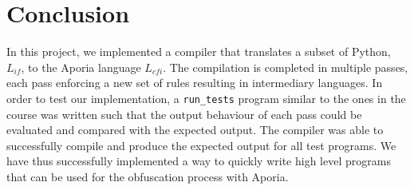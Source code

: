 \section{Conclusion}

In this project, we implemented a compiler that translates a subset of Python, $L_{if}$, to the Aporia language $L_{cfi}$.
The compilation is completed in multiple passes, each pass enforcing a new set of rules resulting in intermediary languages.
In order to test our implementation, a \texttt{run\_tests} program similar to the ones in the course was written such that the 
output behaviour of each pass could be evaluated and compared with the expected output.
The compiler was able to successfully compile and produce the expected output for all test programs.
We have thus successfully implemented a way to quickly write high level programs that can be used for the obfuscation process with Aporia.
